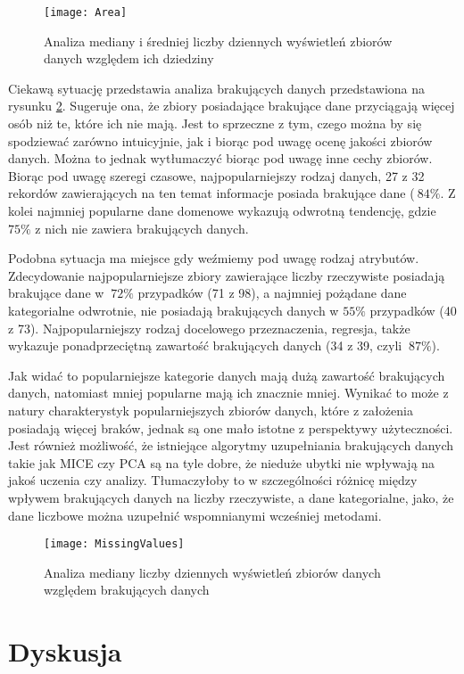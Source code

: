 \begin{figure}[ht]
  \texttt{[image: Area]}
  \caption{Analiza mediany i średniej liczby dziennych wyświetleń zbiorów danych względem ich dziedziny}
  \label{fig:area}
\end{figure}

Ciekawą sytuację przedstawia analiza brakujących danych przedstawiona na rysunku \ref{fig:missingvalues}.
Sugeruje ona, że zbiory posiadające brakujące dane przyciągają więcej osób niż te, które ich nie mają.
Jest to sprzeczne z tym, czego można by się spodziewać zarówno intuicyjnie, jak i biorąc pod uwagę ocenę jakości zbiorów danych.
Można to jednak wytłumaczyć biorąc pod uwagę inne cechy zbiorów.
Biorąc pod uwagę szeregi czasowe, najpopularniejszy rodzaj danych, 27 z 32 rekordów zawierających na ten temat informacje posiada brakujące dane (\(~84\%\).
Z kolei najmniej popularne dane domenowe wykazują odwrotną tendencję, gdzie \(75\%\) z nich nie zawiera brakujących danych.

Podobna sytuacja ma miejsce gdy weźmiemy pod uwagę rodzaj atrybutów.
Zdecydowanie najpopularniejsze zbiory zawierające liczby rzeczywiste posiadają brakujące dane w \(~72\%\) przypadków (71 z 98), a najmniej pożądane dane kategorialne odwrotnie, nie posiadają brakujących danych w \(55\%\) przypadków (40 z 73).
Najpopularniejszy rodzaj docelowego przeznaczenia, regresja, także wykazuje ponadprzeciętną zawartość brakujących danych (34 z 39, czyli \(~87\%\)).

Jak widać to popularniejsze kategorie danych mają dużą zawartość brakujących danych, natomiast mniej popularne mają ich znacznie mniej.
Wynikać to może z natury charakterystyk popularniejszych zbiorów danych, które z założenia posiadają więcej braków, jednak są one mało istotne z perspektywy użyteczności.
Jest również możliwość, że istniejące algorytmy uzupełniania brakujących danych takie jak MICE czy PCA są na tyle dobre, że nieduże ubytki nie wpływają na jakoś uczenia czy analizy.
Tłumaczyłoby to w szczególności różnicę między wpływem brakujących danych na liczby rzeczywiste, a dane kategorialne, jako, że dane liczbowe można uzupełnić wspomnianymi wcześniej metodami.

\begin{figure}[ht]
  \texttt{[image: MissingValues]}
  \caption{Analiza mediany liczby dziennych wyświetleń zbiorów danych względem brakujących danych}
  \label{fig:missingvalues}
\end{figure}

\section{Dyskusja}

